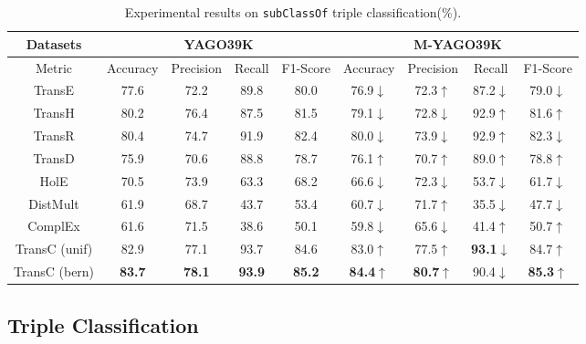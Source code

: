\documentclass[11pt,a4paper]{article}
\begin{document}
  \begin{table*}[!htb]
    \centering
    \setlength{\belowcaptionskip}{-1pt}
    \small
        \begin{tabular}{c|cccc|cccc}
        \hline
        Datasets & \multicolumn{4}{c|}{YAGO39K} & \multicolumn{4}{c}{M-YAGO39K}\\
        \hline
        \multirow{1}{*}{Metric} & Accuracy & Precision & Recall & F1-Score & Accuracy & Precision & Recall & F1-Score \\
        \hline
        TransE  & 77.6  & 72.2  & 89.8   & 80.0 & 76.9$\downarrow$  & 72.3$\uparrow$  & 87.2$\downarrow$   & 79.0$\downarrow$   \\
        TransH  & 80.2  & 76.4   & 87.5   & 81.5  & 79.1$\downarrow$  & 72.8$\downarrow$   & 92.9$\uparrow$   & 81.6$\uparrow$ \\
        TransR  & 80.4  & 74.7   & 91.9   & 82.4  & 80.0$\downarrow$  & 73.9$\downarrow$   & 92.9$\uparrow$   & 82.3$\downarrow$ \\
        TransD  & 75.9  & 70.6   & 88.8   & 78.7   & 76.1$\uparrow$  & 70.7$\uparrow$   & 89.0$\uparrow$   & 78.8$\uparrow$\\
        HolE    & 70.5  & 73.9   & 63.3   & 68.2   & 66.6$\downarrow$  & 72.3$\downarrow$   & 53.7$\downarrow$   & 61.7$\downarrow$\\
        DistMult & 61.9  & 68.7   & 43.7   & 53.4   & 60.7$\downarrow$  & 71.7$\uparrow$   & 35.5$\downarrow$   & 47.7$\downarrow$\\
        ComplEx & 61.6  & 71.5   & 38.6   & 50.1   & 59.8$\downarrow$  & 65.6$\downarrow$   & 41.4$\uparrow$   & 50.7$\uparrow$\\
        \hline
        TransC (unif)  & 82.9  & 77.1   & 93.7   & 84.6  & 83.0$\uparrow$  & 77.5$\uparrow$   & \textbf{93.1}$\downarrow$   & 84.7$\uparrow$ \\
        TransC (bern)  & \textbf{83.7}  & \textbf{78.1}   & \textbf{93.9}   & \textbf{85.2}  & \textbf{84.4}$\uparrow$  & \textbf{80.7}$\uparrow$   & 90.4$\downarrow$  & \textbf{85.3}$\uparrow$ \\
        \hline
        \end{tabular} 
        \caption{\label{table4}Experimental results on \texttt{subClassOf} triple classification(\%).}
    \end{table*}
  
  \subsection{Triple Classification}\label{triple classification}
  
\end{document}
